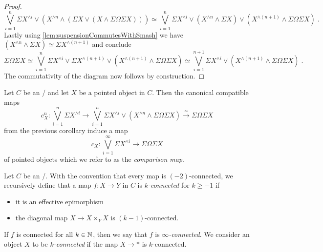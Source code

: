 \begin{corollary}
\begin{proof}
        \begin{equation*}
            \bigvee\limits_{i=1}^n\Sigma X^{\wedge i}\vee\left(X^{\wedge n}\wedge\left(\Sigma X\vee\left(X\wedge\Sigma\Omega\Sigma X\right)\right)\right)\simeq\bigvee\limits_{i=1}^n\Sigma X^{\wedge i}\vee\left(X^{\wedge n}\wedge\Sigma X\right)\vee\left(X^{\wedge (n+1)}\wedge\Sigma\Omega\Sigma X\right)\;.
        \end{equation*}
        Lastly using \cref{lem:suspensionCommutesWithSmash} we have $\left(X^{\wedge n}\wedge\Sigma X\right)\simeq \Sigma X^{\wedge (n+1)}$ and conclude
        \begin{equation*}
            \Sigma\Omega\Sigma X\simeq\bigvee\limits_{i=1}^n\Sigma X^{\wedge i}\vee\Sigma X^{\wedge (n+1)} \vee\left(X^{\wedge (n+1)}\wedge\Sigma\Omega\Sigma X\right)\simeq\bigvee\limits_{i=1}^{n+1}\Sigma X^{\wedge i}\vee\left(X^{\wedge (n+1)}\wedge\Sigma\Omega\Sigma X\right)\;.
        \end{equation*}
        The commutativity of the diagram now follows by construction.
    \end{proof}
\end{corollary}
\begin{definition}\label{def:jamesSplittingMap}
    Let $C$ be an \inftytop/ and let $X$ be a pointed object in $C$. 
    Then the canonical compatible maps 
    \begin{equation*}
        c_X^n\colon\bigvee\limits_{i=1}^n\Sigma X^{\wedge i}\to\bigvee\limits_{i=1}^n\Sigma X^{\wedge i}\vee\left(X^{\wedge n}\wedge\Sigma\Omega\Sigma X\right)\xrightarrow{\simeq}\Sigma\Omega\Sigma X
    \end{equation*}
    from the previous corollary induce a map
    \begin{equation*}
        c_X\colon\bigvee\limits_{i=1}^{\infty}\Sigma X^{\wedge i}\to\Sigma\Omega\Sigma X
    \end{equation*}
    of pointed objects which we refer to as the \emph{comparison map}.
\end{definition}
\begin{definition}\label{def:connected}
    Let $C$ be an \inftytop/.
    With the convention that every map is $(-2)$-connected, we recursively define that a map $f\colon X\to Y$ in $C$ is \emph{$k$-connected} for $k\geq -1$ if
    \begin{itemize}
        \item it is an effective epimorphism
        \item the diagonal map $X\to X\times_YX$ is $(k-1)$-connected.
    \end{itemize} 
    If $f$ is connected for all $k\in\mathbb{N}$, then we say that $f$ is \emph{$\infty$-connected}.
    We consider an object $X$ to be \emph{$k$-connected} if the map $X\to *$ is $k$-connected.
\end{definition}
